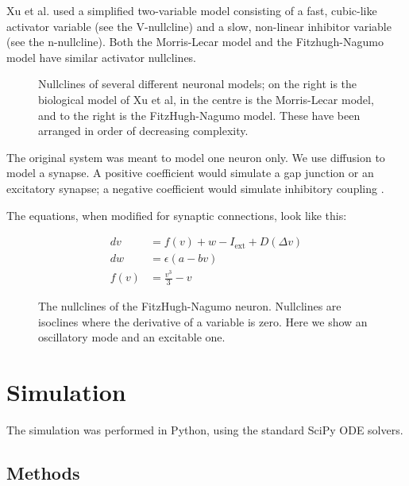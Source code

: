 \documentclass[
    11pt,
]{article}
\begin{document}
Xu et al. used a simplified two-variable model consisting of a fast, cubic-like activator variable (see the V-nullcline) and a slow, non-linear inhibitor variable (see the n-nullcline). Both the Morris-Lecar model and the Fitzhugh-Nagumo model have similar activator nullclines.

\begin{figure}[h!]
    \label{fig: nm nullclines}
    \centering
    \caption{Nullclines of several different neuronal models; on the right is the biological model of Xu et al, in the centre is the Morris-Lecar model, and to the right is the FitzHugh-Nagumo model.  These have been arranged in order of decreasing complexity.}
\end{figure} %

The original system was meant to model one neuron only.  We use diffusion to
model a synapse. A positive coefficient would simulate a gap junction or
an excitatory synapse; a negative coefficient would simulate inhibitory
coupling \citep{collins1994}.

The equations, when modified for synaptic connections, look like this:

\begin{equation}
    \label{eq: fhnd}
    \begin{aligned}
        dv &= f(v) + w - I_\mathrm{ext} + D(Δv)\\
        dw &= ϵ(a - bv)\\
        f(v) &= \frac{v^3}{3} - v
    \end{aligned}
\end{equation}

\begin{figure}[h!]
    \label{fig: fhn_dynamics}
    \centering
    \caption{The nullclines of the FitzHugh-Nagumo neuron.  Nullclines are isoclines where the derivative of a variable is zero.  Here we show an oscillatory mode and an excitable one.}
\end{figure} %



\section{Simulation}

The simulation was performed in Python, using the standard SciPy ODE solvers.

\subsection{Methods}
\end{document}
